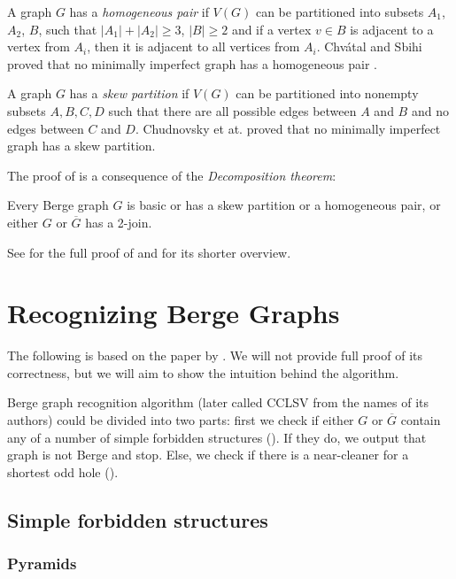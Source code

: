 A graph $G$ has a \emph{homogeneous pair} if $V(G)$ can be partitioned into subsets $A_1$, $A_2$, $B$, such that $|A_1|+|A_2| \geq 3$, $|B| \geq 2$ and if a vertex $v \in B$ is adjacent to a vertex from $A_i$, then it is adjacent to all vertices from $A_i$. Chvátal and Sbihi proved that no minimally imperfect graph has a homogeneous pair \cite{Chvtal1987}.

A graph $G$ has a \emph{skew partition} if $V(G)$ can be partitioned into nonempty subsets $A, B, C, D$ such that there are all possible edges between $A$ and $B$ and no edges between $C$ and $D$. Chudnovsky et at. proved that no minimally imperfect graph has a skew partition.

The proof of  is a consequence of the \emph{Decomposition theorem}:
\begin{theorem}
	\label{thm:decomposition}
	Every Berge graph $G$ is basic or has a skew partition or a homogeneous pair, or either $G$ or $\overline{G}$ has a 2-join.
\end{theorem}

See \cite{MC06} for the full proof of  and \cite{GC03} for its shorter overview.

\section{Recognizing Berge Graphs}
\label{sec:recognizingBerge}

The following is based on the paper by \citeauthor{MC05}  \cite{MC05}. We will not provide full proof of its correctness, but we will aim to show the intuition behind the algorithm.

Berge graph recognition algorithm (later called CCLSV from the names of its authors) could be divided into two parts: first we check if either $G$ or $\overline{G}$ contain any of a number of simple forbidden structures (). If they do, we output that graph is not Berge and stop. Else, we check if there is a near-cleaner for a shortest odd hole ().

\subsection{Simple forbidden structures}
\label{SimpleStructures}

\subsubsection{Pyramids}


